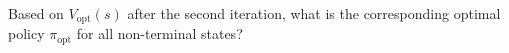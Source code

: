 \item {}
Based on $V_\text{opt}(s)$ after the second iteration, what is the corresponding
optimal policy $\pi_\text{opt}$ for all non-terminal states?
